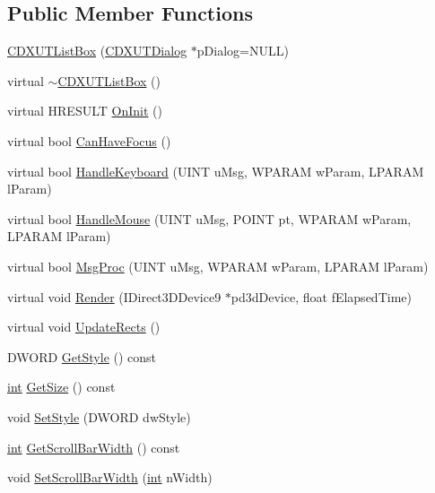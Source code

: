 \subsection*{Public Member Functions}
\begin{DoxyCompactItemize}
\item 
\hyperlink{class_c_d_x_u_t_list_box_acd6d6d877a81e65b26e01093951c3c50}{CDXUTListBox} (\hyperlink{class_c_d_x_u_t_dialog}{CDXUTDialog} $\ast$pDialog=NULL)
\item 
virtual \hyperlink{class_c_d_x_u_t_list_box_aed019ebbcc78ddb72432959495d29040}{$\sim$CDXUTListBox} ()
\item 
virtual HRESULT \hyperlink{class_c_d_x_u_t_list_box_af999f44d44f4b6aa1f434d95317119af}{OnInit} ()
\item 
virtual bool \hyperlink{class_c_d_x_u_t_list_box_adbe71e402fd89d6382b60a35b34c0fa9}{CanHaveFocus} ()
\item 
virtual bool \hyperlink{class_c_d_x_u_t_list_box_a20b2dc81c2af1206a21b19f46f8300a4}{HandleKeyboard} (UINT uMsg, WPARAM wParam, LPARAM lParam)
\item 
virtual bool \hyperlink{class_c_d_x_u_t_list_box_a7d184abbad5688513f0fb25d6a37528f}{HandleMouse} (UINT uMsg, POINT pt, WPARAM wParam, LPARAM lParam)
\item 
virtual bool \hyperlink{class_c_d_x_u_t_list_box_a05c8bdcfa42cb829df9b6797684ae938}{MsgProc} (UINT uMsg, WPARAM wParam, LPARAM lParam)
\item 
virtual void \hyperlink{class_c_d_x_u_t_list_box_a7c7284c4fd33fc3d074d3477b3e54d60}{Render} (IDirect3DDevice9 $\ast$pd3dDevice, float fElapsedTime)
\item 
virtual void \hyperlink{class_c_d_x_u_t_list_box_a295c60c194d1126086d26bad65a17efc}{UpdateRects} ()
\item 
DWORD \hyperlink{class_c_d_x_u_t_list_box_a11e88f4e848a524086c1f1f7767ef1f2}{GetStyle} () const 
\item 
\hyperlink{_d_x_u_tgui_8cpp_a2d77ed03302b6978834ee3b6f57837fb}{int} \hyperlink{class_c_d_x_u_t_list_box_ac29427369066a473e35fb33795275e15}{GetSize} () const 
\item 
void \hyperlink{class_c_d_x_u_t_list_box_aabaa331fd9dfac04ba655a369d1cef0e}{SetStyle} (DWORD dwStyle)
\item 
\hyperlink{_d_x_u_tgui_8cpp_a2d77ed03302b6978834ee3b6f57837fb}{int} \hyperlink{class_c_d_x_u_t_list_box_a17fcbaece1316f5de54868bdb468fe6f}{GetScrollBarWidth} () const 
\item 
void \hyperlink{class_c_d_x_u_t_list_box_a21b4a1c70d8b5fc213760927b9ae5c1d}{SetScrollBarWidth} (\hyperlink{_d_x_u_tgui_8cpp_a2d77ed03302b6978834ee3b6f57837fb}{int} nWidth)

\end{DoxyCompactItemize}
